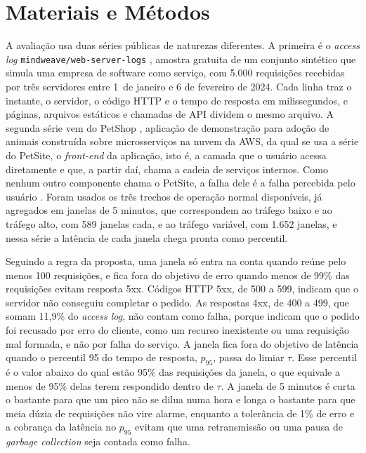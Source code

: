 \documentclass[12pt, a4paper, oneside]{article}
\begin{document}
\section{Materiais e Métodos}

A avaliação usa duas séries públicas de naturezas diferentes. A primeira é o \textit{access log} \texttt{mindweave/web-server-logs} \cite{hfweblogs}, amostra gratuita de um conjunto sintético que simula uma empresa de software como serviço, com 5.000 requisições recebidas por três servidores entre 1\textordmasculine\ de janeiro e 6 de fevereiro de 2024. Cada linha traz o instante, o servidor, o código HTTP e o tempo de resposta em milissegundos, e páginas, arquivos estáticos e chamadas de API dividem o mesmo arquivo. A segunda série vem do PetShop \cite{hardt2024petshop}, aplicação de demonstração para adoção de animais construída sobre microsserviços na nuvem da AWS, da qual se usa a série do PetSite, o \textit{front-end} da aplicação, isto é, a camada que o usuário acessa diretamente e que, a partir daí, chama a cadeia de serviços internos. Como nenhum outro componente chama o PetSite, a falha dele é a falha percebida pelo usuário \cite{oppenheimer2003}. Foram usados os três trechos de operação normal disponíveis, já agregados em janelas de 5 minutos, que correspondem ao tráfego baixo e ao tráfego alto, com 589 janelas cada, e ao tráfego variável, com 1.652 janelas, e nessa série a latência de cada janela chega pronta como percentil.

Seguindo a regra da proposta, uma janela só entra na conta quando reúne pelo menos 100 requisições, e fica fora do objetivo de erro quando menos de 99\% das requisições evitam resposta 5xx. Códigos HTTP 5xx, de 500 a 599, indicam que o servidor não conseguiu completar o pedido. As respostas 4xx, de 400 a 499, que somam 11,9\% do \textit{access log}, não contam como falha, porque indicam que o pedido foi recusado por erro do cliente, como um recurso inexistente ou uma requisição mal formada, e não por falha do serviço. A janela fica fora do objetivo de latência quando o percentil 95 do tempo de resposta, $p_{95}$, passa do limiar $\tau$. Esse percentil é o valor abaixo do qual estão 95\% das requisições da janela, o que equivale a menos de 95\% delas terem respondido dentro de $\tau$. A janela de 5 minutos é curta o bastante para que um pico não se dilua numa hora e longa o bastante para que meia dúzia de requisições não vire alarme, enquanto a tolerância de 1\% de erro e a cobrança da latência no $p_{95}$ evitam que uma retransmissão ou uma pausa de \textit{garbage collection} seja contada como falha.
\end{document}
